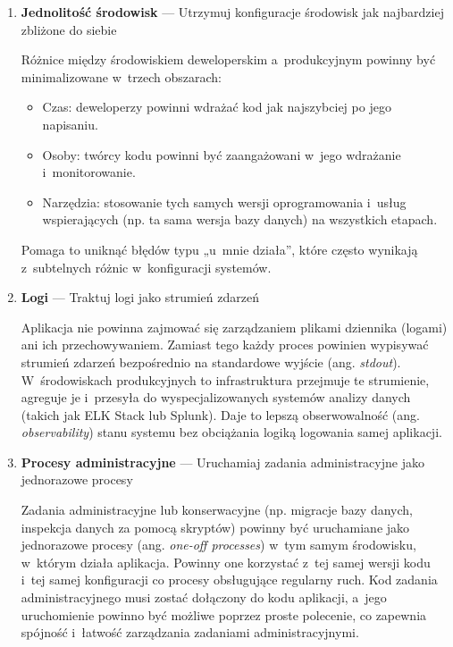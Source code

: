 \begin{enumerate}[label=\Roman*., font=\bfseries]
    \item \textbf{Jednolitość środowisk} --- Utrzymuj konfiguracje środowisk jak najbardziej zbliżone do siebie

          Różnice między środowiskiem deweloperskim a~produkcyjnym powinny być minimalizowane w~trzech obszarach:
          \begin{itemize}
              \item Czas: deweloperzy powinni wdrażać kod jak najszybciej po jego napisaniu.
              \item Osoby: twórcy kodu powinni być zaangażowani w~jego wdrażanie i~monitorowanie.
              \item Narzędzia: stosowanie tych samych wersji oprogramowania i~usług wspierających (np. ta sama wersja bazy danych) na wszystkich etapach.
          \end{itemize}
          Pomaga to uniknąć błędów typu „u~mnie działa”, które często wynikają z~subtelnych różnic w~konfiguracji systemów.

    \item \textbf{Logi} --- Traktuj logi jako strumień zdarzeń

          Aplikacja nie powinna zajmować się zarządzaniem plikami dziennika (logami) ani ich przechowywaniem.
          Zamiast tego każdy proces powinien wypisywać strumień zdarzeń bezpośrednio na standardowe wyjście (ang. \textit{stdout}).
          W~środowiskach produkcyjnych to infrastruktura przejmuje te strumienie, agreguje je i~przesyła do wyspecjalizowanych systemów analizy danych (takich jak ELK Stack lub Splunk).
          Daje to lepszą obserwowalność (ang. \textit{observability}) stanu systemu bez obciążania logiką logowania samej aplikacji.

    \item \textbf{Procesy administracyjne} --- Uruchamiaj zadania administracyjne jako jednorazowe procesy

          Zadania administracyjne lub konserwacyjne (np. migracje bazy danych, inspekcja danych za pomocą skryptów) powinny być uruchamiane jako jednorazowe procesy (ang. \textit{one-off processes}) w~tym samym środowisku, w~którym działa aplikacja.
          Powinny one korzystać z~tej samej wersji kodu i~tej samej konfiguracji co procesy obsługujące regularny ruch.
          Kod zadania administracyjnego musi zostać dołączony do kodu aplikacji, a~jego uruchomienie powinno być możliwe poprzez proste polecenie, co zapewnia spójność i~łatwość zarządzania zadaniami administracyjnymi.
\end{enumerate}

